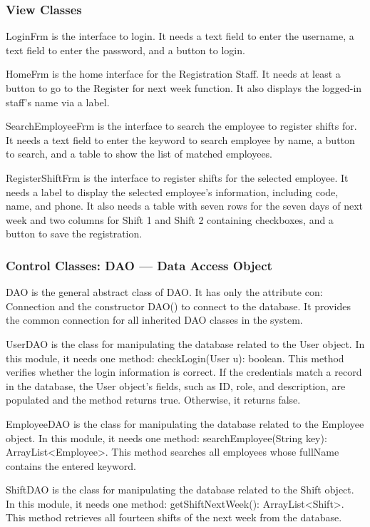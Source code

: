 \subsubsection{View Classes}

LoginFrm is the interface to login. It needs a text field to enter the username, a text field to enter the password, and a button to login.

HomeFrm is the home interface for the Registration Staff. It needs at least a button to go to the Register for next week function. It also displays the logged-in staff's name via a label.

SearchEmployeeFrm is the interface to search the employee to register shifts for. It needs a text field to enter the keyword to search employee by name, a button to search, and a table to show the list of matched employees.

RegisterShiftFrm is the interface to register shifts for the selected employee. It needs a label to display the selected employee's information, including code, name, and phone. It also needs a table with seven rows for the seven days of next week and two columns for Shift 1 and Shift 2 containing checkboxes, and a button to save the registration.

\subsubsection{Control Classes: DAO --- Data Access Object}

DAO is the general abstract class of DAO. It has only the attribute con: Connection and the constructor DAO() to connect to the database. It provides the common connection for all inherited DAO classes in the system.

UserDAO is the class for manipulating the database related to the User object. In this module, it needs one method: checkLogin(User u): boolean. This method verifies whether the login information is correct. If the credentials match a record in the database, the User object's fields, such as ID, role, and description, are populated and the method returns true. Otherwise, it returns false.

EmployeeDAO is the class for manipulating the database related to the Employee object. In this module, it needs one method: searchEmployee(String key): ArrayList<Employee>. This method searches all employees whose fullName contains the entered keyword.

ShiftDAO is the class for manipulating the database related to the Shift object. In this module, it needs one method: getShiftNextWeek(): ArrayList<Shift>. This method retrieves all fourteen shifts of the next week from the database.

